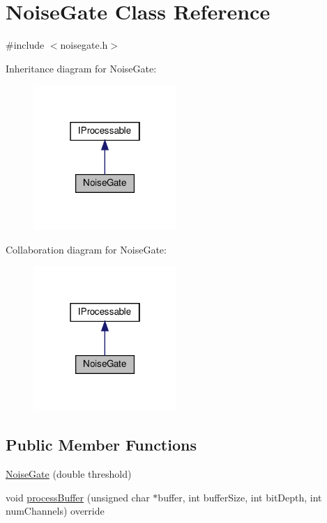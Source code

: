 \hypertarget{classNoiseGate}{}\section{Noise\+Gate Class Reference}
\label{classNoiseGate}


{\ttfamily \#include $<$noisegate.\+h$>$}



Inheritance diagram for Noise\+Gate\+:
\nopagebreak
\begin{figure}[H]
\begin{center}
\leavevmode
\includegraphics[width=154pt]{d5/d39/classNoiseGate__inherit__graph}
\end{center}
\end{figure}


Collaboration diagram for Noise\+Gate\+:
\nopagebreak
\begin{figure}[H]
\begin{center}
\leavevmode
\includegraphics[width=154pt]{d8/da9/classNoiseGate__coll__graph}
\end{center}
\end{figure}
\subsection*{Public Member Functions}
\begin{DoxyCompactItemize}
\item 
\hyperlink{classNoiseGate_a5106cfbd673a9ba6faf5f283a92ebf93}{Noise\+Gate} (double threshold)
\item 
void \hyperlink{classNoiseGate_a7d58bdbe85f4e2709c77f5d3d5f34e09}{process\+Buffer} (unsigned char $\ast$buffer, int buffer\+Size, int bit\+Depth, int num\+Channels) override
\end{DoxyCompactItemize}


